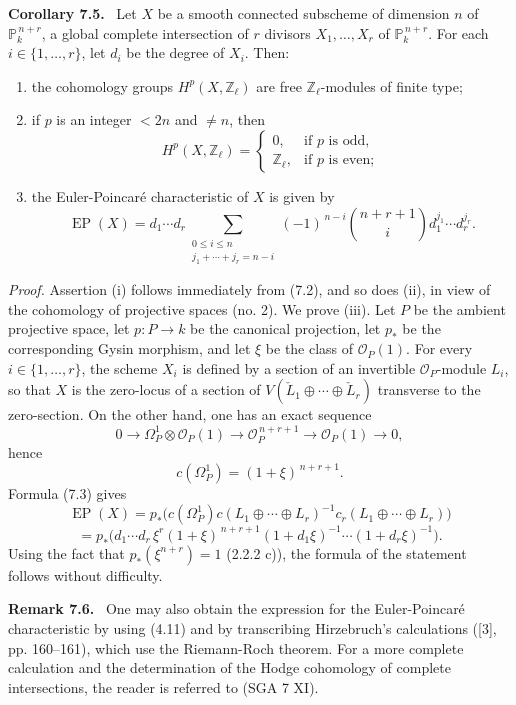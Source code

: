 \documentclass[11pt]{article}
\newenvironment{statement}[1]{\par\medskip\noindent\textbf{#1.}\ }{\par\medskip}
\begin{document}
\begin{statement}{Corollary 7.5}
Let $X$ be a smooth connected subscheme of dimension $n$ of $\mathbb P_k^{\,n+r}$, a global complete intersection of $r$ divisors $X_1,\ldots,X_r$ of $\mathbb P_k^{\,n+r}$. For each $i\in\{1,\ldots,r\}$, let $d_i$ be the degree of $X_i$. Then:
\begin{enumerate}[label=(\roman*)]
\item the cohomology groups $H^p(X,\mathbb Z_\ell)$ are free $\mathbb Z_\ell$-modules of finite type;
\item if $p$ is an integer $<2n$ and $\ne n$, then
\[
H^p(X,\mathbb Z_\ell)=
\begin{cases}
0,&\text{if }p\text{ is odd},\\
\mathbb Z_\ell,&\text{if }p\text{ is even};
\end{cases}
\]
\item the Euler-Poincaré characteristic of $X$ is given by
\[
\operatorname{EP}(X)
=d_1\cdots d_r
\sum_{\substack{0\le i\le n\\ j_1+\cdots+j_r=n-i}}
(-1)^{\,n-i}\binom{n+r+1}{i}
d_1^{j_1}\cdots d_r^{j_r}.
\]
\end{enumerate}
\end{statement}

\emph{Proof.} Assertion (i) follows immediately from (7.2), and so does (ii), in view of the cohomology of projective spaces (no. 2). We prove (iii). Let $P$ be the ambient projective space, let $p:P\to k$ be the canonical projection, let $p_*$ be the corresponding Gysin morphism, and let $\xi$ be the class of $\mathcal O_P(1)$. For every $i\in\{1,\ldots,r\}$, the scheme $X_i$ is defined by a section of an invertible $\mathcal O_P$-module $L_i$, so that $X$ is the zero-locus of a section of $V(\check L_1\oplus\cdots\oplus\check L_r)$ transverse to the zero-section. On the other hand, one has an exact sequence
\[
0\to\Omega_P^1\otimes\mathcal O_P(1)\to\mathcal O_P^{\,n+r+1}\to\mathcal O_P(1)\to0,
\]
hence
\[
c(\Omega_P^1)=(1+\xi)^{\,n+r+1}.
\]
Formula (7.3) gives
\[
\operatorname{EP}(X)
=p_*\bigl(c(\Omega_P^1)c(L_1\oplus\cdots\oplus L_r)^{-1}
c_r(L_1\oplus\cdots\oplus L_r)\bigr)
\]
\[
=p_*\bigl(d_1\cdots d_r\,\xi^r(1+\xi)^{\,n+r+1}
(1+d_1\xi)^{-1}\cdots(1+d_r\xi)^{-1}\bigr).
\]
Using the fact that $p_*(\xi^{n+r})=1$ (2.2.2 c)), the formula of the statement follows without difficulty.

\begin{statement}{Remark 7.6}
One may also obtain the expression for the Euler-Poincaré characteristic by using (4.11) and by transcribing Hirzebruch's calculations ([3], pp. 160--161), which use the Riemann-Roch theorem. For a more complete calculation and the determination of the Hodge cohomology of complete intersections, the reader is referred to (SGA 7 XI).
\end{statement}
\end{document}
